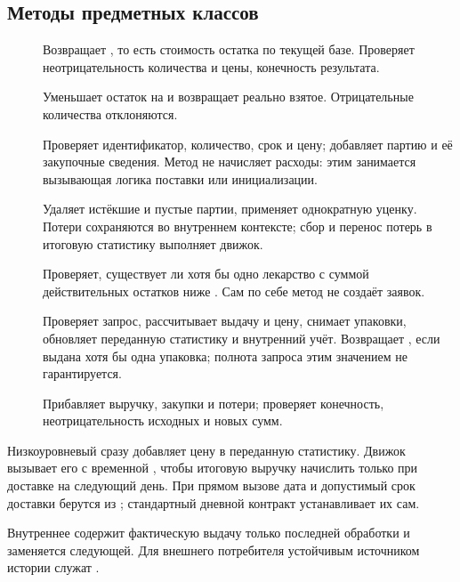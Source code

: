 \subsection{Методы предметных классов}
\begin{description}
  \item[] Возвращает ,
  то есть стоимость остатка по текущей базе. Проверяет неотрицательность
  количества и цены, конечность результата.
  \item[] Уменьшает остаток на
   и возвращает реально взятое. Отрицательные
  количества отклоняются.
  \item[] Проверяет идентификатор,
  количество, срок и цену; добавляет партию и её закупочные сведения.
  Метод не начисляет расходы: этим занимается вызывающая логика поставки
  или инициализации.
  \item[] Удаляет истёкшие и пустые партии,
  применяет однократную уценку. Потери сохраняются во внутреннем контексте;
  сбор и перенос потерь в итоговую статистику выполняет движок.
  \item[] Проверяет, существует ли хотя бы
  одно лекарство с суммой действительных остатков ниже .
  Сам по себе метод не создаёт заявок.
  \item[]
  Проверяет запрос, рассчитывает выдачу и цену, снимает упаковки, обновляет
  переданную статистику и внутренний учёт. Возвращает , если
  выдана хотя бы одна упаковка; полнота запроса этим значением не гарантируется.
  \item[] Прибавляет выручку,
  закупки и потери; проверяет конечность, неотрицательность исходных и новых сумм.
\end{description}

Низкоуровневый  сразу добавляет цену в переданную
статистику. Движок вызывает его с временной ,
чтобы итоговую выручку начислить только при доставке на следующий день.
При прямом вызове дата и допустимый срок доставки берутся из
; стандартный дневной контракт устанавливает их сам.

Внутреннее  содержит фактическую выдачу только
последней обработки и заменяется следующей. Для внешнего потребителя
устойчивым источником истории служат .

